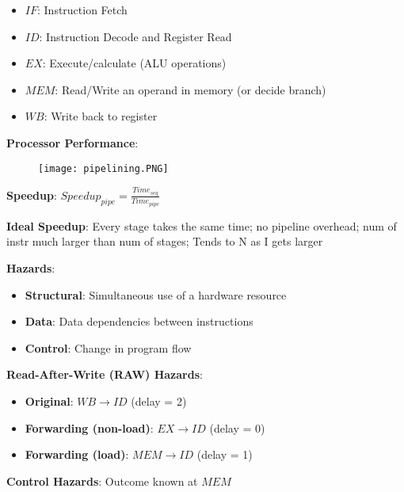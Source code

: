 \documentclass[a4paper,landscape]{article}
\newcommand{\rnname}[1]{\textbf{#1}}
\begin{document}
\begin{multicols*}{4}
\begin{flatitemize}
\vspace{-0.5em}
\begin{itemize}
\item $IF$: Instruction Fetch
\item $ID$: Instruction Decode and Register Read
\item $EX$: Execute/calculate (ALU operations)
\item $MEM$: Read/Write an operand in memory (or decide branch)
\item $WB$: Write back to register
\end{itemize}
\item \rnname{Processor Performance}:
\vspace{-1em}
\begin{figure}[H]
  \texttt{[image: pipelining.PNG]}
\end{figure}
\vspace{-1.5em}
\item \rnname{Speedup}: $Speedup_{pipe} = \frac{Time_{seq}}{Time_{pipe}}$
\item \rnname{Ideal Speedup}: Every stage takes the same time; no pipeline overhead; num of instr much larger than num of stages; Tends to N as I gets larger
\item \rnname{Hazards}:
\vspace{-0.5em}
\begin{itemize}
\item \textbf{Structural}: Simultaneous use of a hardware resource
\item \textbf{Data}: Data dependencies between instructions
\item \textbf{Control}: Change in program flow
\end{itemize}
\vspace{-0.5em}
\item \rnname{Read-After-Write (RAW) Hazards}:
\vspace{-0.5em}
\begin{itemize}
\item \textbf{Original}: $WB \rightarrow ID$ (delay = 2)
\item \textbf{Forwarding (non-load)}: $EX \rightarrow ID$ (delay = 0)
\item \textbf{Forwarding (load)}: $MEM \rightarrow ID$ (delay = 1)
\end{itemize}
\item \rnname{Control Hazards}: Outcome known at $MEM$
\vspace{-0.5em}
\begin{itemize}

\end{itemize}
\end{flatitemize}
\end{multicols*}
\end{document}
